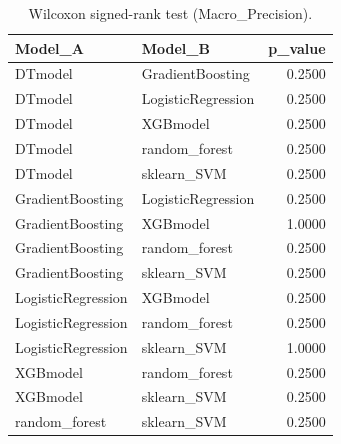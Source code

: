 \begin{table}[t]
\centering
\begin{tabular}{llr}
\toprule
Model_A & Model_B & p_value \\
\midrule
DTmodel & GradientBoosting & 0.2500 \\
DTmodel & LogisticRegression & 0.2500 \\
DTmodel & XGBmodel & 0.2500 \\
DTmodel & random_forest & 0.2500 \\
DTmodel & sklearn_SVM & 0.2500 \\
GradientBoosting & LogisticRegression & 0.2500 \\
GradientBoosting & XGBmodel & 1.0000 \\
GradientBoosting & random_forest & 0.2500 \\
GradientBoosting & sklearn_SVM & 0.2500 \\
LogisticRegression & XGBmodel & 0.2500 \\
LogisticRegression & random_forest & 0.2500 \\
LogisticRegression & sklearn_SVM & 1.0000 \\
XGBmodel & random_forest & 0.2500 \\
XGBmodel & sklearn_SVM & 0.2500 \\
random_forest & sklearn_SVM & 0.2500 \\
\bottomrule
\end{tabular}
\caption{Wilcoxon signed-rank test (Macro_Precision).}
\label{tab:wilcoxon_Macro_Precision}
\end{table}